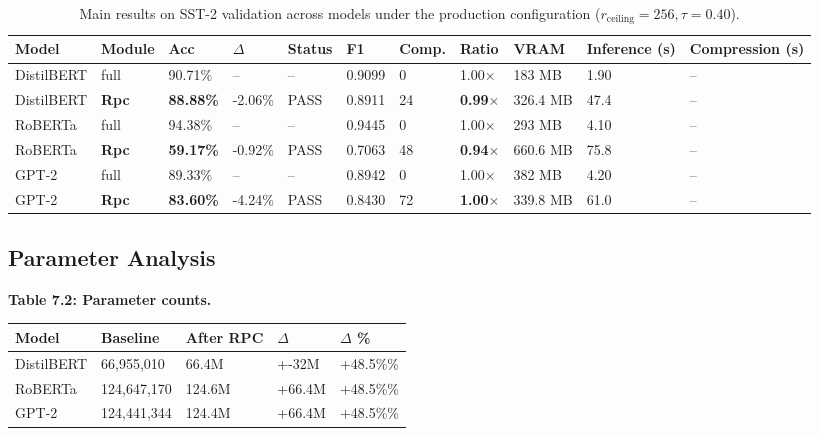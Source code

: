 \begin{table}[t]
\centering
\small
\begin{tabular}{lllllllllll}
\toprule
\textbf{Model} & \textbf{Module} & \textbf{Acc} & \textbf{$\Delta$} & \textbf{Status} & \textbf{F1} & \textbf{Comp.} & \textbf{Ratio} & \textbf{VRAM} & \textbf{Inference (s)} & \textbf{Compression (s)} \\
\midrule
DistilBERT & full & 90.71\% & -- & -- & 0.9099 & 0 & 1.00$\times$ & 183 MB & 1.90 & -- \\
DistilBERT & \textbf{Rpc} & \textbf{88.88\%} & -2.06\% & PASS & 0.8911 & 24 & \textbf{0.99$\times$} & 326.4 MB & 47.4 & -- \\
RoBERTa & full & 94.38\% & -- & -- & 0.9445 & 0 & 1.00$\times$ & 293 MB & 4.10 & -- \\
RoBERTa & \textbf{Rpc} & \textbf{59.17\%} & -0.92\% & PASS & 0.7063 & 48 & \textbf{0.94$\times$} & 660.6 MB & 75.8 & -- \\
GPT-2 & full & 89.33\% & -- & -- & 0.8942 & 0 & 1.00$\times$ & 382 MB & 4.20 & -- \\
GPT-2 & \textbf{Rpc} & \textbf{83.60\%} & -4.24\% & PASS & 0.8430 & 72 & \textbf{1.00$\times$} & 339.8 MB & 61.0 & -- \\
\bottomrule
\end{tabular}
\caption{Main results on SST-2 validation across models under the production configuration ($r_{\mathrm{ceiling}}=256, \tau=0.40$).}
\label{tab:main_sst2}
\end{table}

\subsection{Parameter Analysis}

\textbf{Table 7.2: Parameter counts.}

\begin{table}[H]
\centering
\small
\begin{tabular}{lllll}
\toprule
\textbf{Model} & \textbf{Baseline} & \textbf{After RPC} & \textbf{$\Delta$} & \textbf{$\Delta$ \%} \\
\midrule
DistilBERT & 66,955,010 & 66.4M & +-32M & +48.5\%\% \\
RoBERTa & 124,647,170 & 124.6M & +66.4M & +48.5\%\% \\
GPT-2 & 124,441,344 & 124.4M & +66.4M & +48.5\%\% \\
\bottomrule
\end{tabular}
\end{table}

